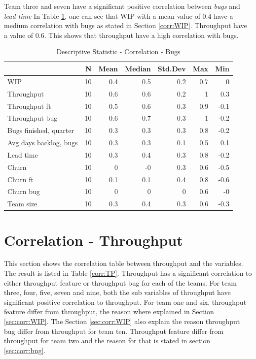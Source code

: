 \documentclass[UKenglish]{ifimaster}  %
\begin{document}
Team three and seven have a significant positive correlation between \textit{bugs} and \textit{lead time}
In Table \ref{DS:corr:Bugs}, one can see that WIP with a mean value of 0.4 have a medium correlation with bugs as stated in Section \ref{corr:WIP}.  Throughput  have a value of 0.6. This shows that throughput have a high correlation with bugs.

\begin{table}[!htbp]
 \centering
 \begin{tabular}{ | l | r | r | r | r | r | r | }
 \hline
& \bf{N} & \bf{Mean} & \bf{Median} & \bf{Std.Dev} & \bf{Max} & \bf{Min} \\ \hline
WIP  & 10 & 0.4 & 0.5 & 0.2 & 0.7 & 0\\ \hline
Throughput  & 10 & 0.6 & 0.6 & 0.2 & 1 & 0.3\\ \hline
Throughput ft  & 10 & 0.5 & 0.6 & 0.3 & 0.9 & -0.1\\ \hline
Throughput bug  & 10 & 0.6 & 0.7 & 0.3 & 1 & -0.2\\ \hline
Bugs finished, quarter  & 10 & 0.3 & 0.3 & 0.3 & 0.8 & -0.2\\ \hline
Avg days backlog, bugs  & 10 & 0.3 & 0.3 & 0.1 & 0.5 & 0.1\\ \hline
Lead time & 10 & 0.3 & 0.4 & 0.3 & 0.8 & -0.2\\ \hline
Churn  & 10 & 0 & -0 & 0.3 & 0.6 & -0.5\\ \hline
Churn ft  & 10 & 0.1 & 0.1 & 0.4 & 0.8 & -0.6\\ \hline
Churn bug  & 10 & 0 & 0 & 0 & 0.6 & -0\\ \hline
Team size  & 10 & 0.3 & 0.4 & 0.3 & 0.6 & -0.3\\ \hline
\end{tabular}
 \caption{Descriptive Statistic - Correlation - Bugs}
 \label{DS:corr:Bugs}
 \end{table}


\section {Correlation - Throughput}
\label{sec:corr:TP}
This section shows the correlation table between throughput and the variables. The result is listed in Table \ref{corr:TP}. Throughput has a significant correlation to either throughput feature or throughput bug for each of the teams. For team three, four, five, seven and nine, both the sub variables of throughput have significant positive correlation to throughput. For team one and six, throughput feature differ from throughput, the reason where explained in Section \ref{sec:corr:WIP}.   The Section \ref{sec:corr:WIP} also explain the reason throughput bug differ from throughput for team ten.    Throughput feature differ from throughput for team two and the reason for that is stated in section \ref{sec:corr:bug}.
\end{document}
